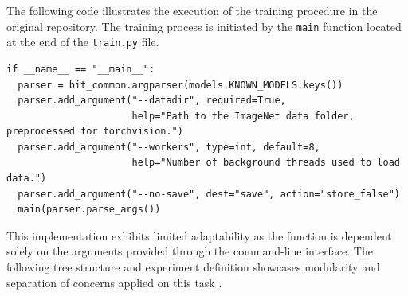 \documentclass{article}
\begin{document}
The following code illustrates the execution of the training procedure in the original repository. The training process is initiated by the \texttt{main} function located at the end of the \texttt{train.py} file. 
\begin{verbatim}
if __name__ == "__main__":
  parser = bit_common.argparser(models.KNOWN_MODELS.keys())
  parser.add_argument("--datadir", required=True,
                      help="Path to the ImageNet data folder, preprocessed for torchvision.")
  parser.add_argument("--workers", type=int, default=8,
                      help="Number of background threads used to load data.")
  parser.add_argument("--no-save", dest="save", action="store_false")
  main(parser.parse_args())
\end{verbatim}

This implementation exhibits limited adaptability as the function is dependent solely on the arguments provided through the command-line interface. The following tree structure and experiment definition showcases modularity and separation of concerns applied on this task .

\vspace{0.5em}
\end{document}
